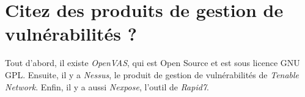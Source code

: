 \section{Citez des produits de gestion de vulnérabilités ?}
Tout d'abord, il existe \textit{OpenVAS}, qui est Open Source et est sous licence GNU GPL. Ensuite, il y a \textit{Nessus}, le produit de gestion de vulnérabilités de \textit{Tenable Network}. Enfin, il y a aussi \textit{Nexpose}, l'outil de \textit{Rapid7}.